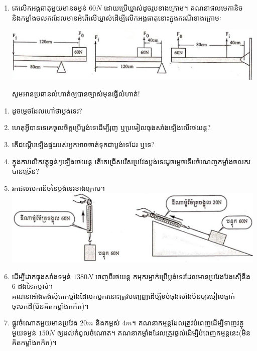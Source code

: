 \documentclass{officialexam}
\begin{document}
\begin{enumerate}[m]
\begin{multicols}{2}
	\end{multicols}
	\item គេលើកអង្គធាតុមួយមានទម្ងន់ $60N$ ដោយប្រើឃ្នាស់ដូចរូបខាងក្រោម។ គណនាផលមេកានិច និងកម្លាំងចលករដែលមានអំពើលើឃ្នាស់ដើម្បីលើកអង្គធាតុនោះក្នុងករណីខាងក្រោមៈ\\
	\begin{center}
		\includegraphics[scale=0.4]{14}
	\end{center}
\begin{center}
	\sffamily\color{blue}
	សូមអានប្រធានលំហាត់ឲ្យបានច្បាស់មុនធ្វើលំហាត់!
\end{center}
\end{enumerate}\newpage
{}
\begin{enumerate}[m]
	\item ដូចម្តេចដែលហៅថាប្លង់ទេរ?
	\item ហេតុអ្វីបានទេគេចូលចិត្តប្រើប្លង់ទេដើម្បីរុញ ឬប្រមៀលធុងសាំងឡើងលើរថយន្ត?
	\item តើជណ្តើរឡើងផ្ទះរបស់អ្នកអាចចាត់ទុកជាប្លង់ទេដែរ ឬទេ?
	\item ក្នុងការលើកវត្ដុធ្ងន់ៗឡើងរថយន្ត តើគេជ្រើសរើសប្រវែងប្លង់ទេរដូចម្តេចទើបចំណេញកម្លាំងចលករបានច្រើន?
	\item រកផលមេកានិចនៃប្លង់ទេរខាងក្រោម។\\
	\includegraphics[scale=0.3]{15}
	\item ដើម្បីដាកធុងសាំងទម្ងន់ $1380N$ ចេញពីរថយន្ត កម្មករម្នាក់ប្រើប្លង់ទេរដែលមានប្រវែងវែងស្មើនឹង $6$ ដងនៃកម្ពស់។\\
	គណនាអាំងតង់សុីតេកម្លាំងដែលកម្មករនោះត្រូវបញ្ចេញដើម្បីទប់ធុងសាំងមិនឲ្យរមៀលធ្លាក់ចុះមកដី(មិនគិតកម្លាំងកកិត)។
	\item ផ្លូវចំណោតមួយមានប្រវែង $20m$ និងកម្ពស់ $4m$។ គណនាកម្មន្តដែលត្រូវបំពេញដើម្បីទាញវត្ថុមួយទម្ងន់ $150N$ ឲ្យដល់កំពូលចំណោត។ គណនាកម្លាំងដែលត្រូវផ្តល់ដើម្បីបំពេញកម្មន្តនេះ(មិនគិតកម្លាំងកកិត)។
\end{enumerate}
\end{document}
